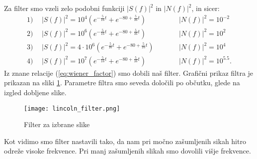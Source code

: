 \documentclass[12pt,a4paper]{article}
\begin{document}
\noindent Za filter smo vzeli zelo podobni funkciji $|S(f)|^{2}$ in $|N(f)|^{2}$, in sicer:
\begin{align*}
1)& \ \ |S(f)|^{2}=10^{4} (e^{-\frac{5}{16} t} + e^{-80 +\frac{5}{16} t}) \qquad & & |N(f)|^{2}= 10^{-2} \\
 2)& \ \ |S(f)|^{2}= 10^{6} (e^{-\frac{5}{16} t} + e^{-80 +\frac{5}{16} t}) \qquad & & |N(f)|^{2}= 10^{2}\\
3)& \ \ |S(f)|^{2}=4 \cdot 10^{6} (e^{-\frac{5}{16} t} + e^{-80 +\frac{5}{16} t}) \qquad & & |N(f)|^{2}= 10^{4} \\
4)& \ \ |S(f)|^{2}= 10^{7} (e^{-\frac{5}{16} t} + e^{-80 +\frac{5}{16} t}) \qquad & & |N(f)|^{2}= 10^{5.5}.
\end{align*}
Iz znane relacije (\ref{eq:wiener_factor}) smo dobili naš filter. Grafični prikaz filtra je prikazan na sliki \ref{fig:slika16}.
Parametre filtra smo seveda določili po občutku, glede na izgled dobljene slike.

\begin{figure}[H]
    \centering
        \texttt{[image: lincoln\_filter.png]}
    \caption{Filter za izbrane slike} \label{fig:slika16}
\end{figure}

Kot vidimo smo filter nastavili tako, da nam pri močno zašumljenih sikah hitro odreže visoke frekvence. Pri manj zašumljenih slikah smo dovolili višje frekvence.
\end{document}
